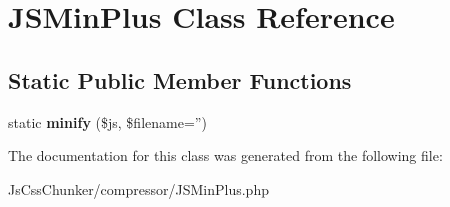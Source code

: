 \hypertarget{class_j_s_min_plus}{
\section{JSMinPlus Class Reference}
\label{class_j_s_min_plus}
}
\subsection*{Static Public Member Functions}
\begin{DoxyCompactItemize}
\item 
\hypertarget{class_j_s_min_plus_aaeba34861d85932df66f053de00255ff}{
static {\bfseries minify} (\$js, \$filename='')}
\label{class_j_s_min_plus_aaeba34861d85932df66f053de00255ff}

\end{DoxyCompactItemize}


The documentation for this class was generated from the following file:\begin{DoxyCompactItemize}
\item 
JsCssChunker/compressor/JSMinPlus.php\end{DoxyCompactItemize}

